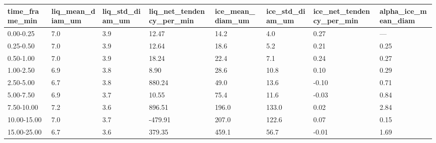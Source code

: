 \begin{tabular}{llllllll}
\toprule
time_frame_min & liq_mean_diam_um & liq_std_diam_um & liq_net_tendency_per_min & ice_mean_diam_um & ice_std_diam_um & ice_net_tendency_per_min & alpha_ice_mean_diam \\
\midrule
0.00-0.25 & 7.0 & 3.9 & 12.47 & 14.2 & 4.0 & 0.27 & — \\
0.25-0.50 & 7.0 & 3.9 & 12.64 & 18.6 & 5.2 & 0.21 & 0.25 \\
0.50-1.00 & 7.0 & 3.9 & 18.24 & 22.4 & 7.1 & 0.24 & 0.27 \\
1.00-2.50 & 6.9 & 3.8 & 8.90 & 28.6 & 10.8 & 0.10 & 0.29 \\
2.50-5.00 & 6.7 & 3.8 & 880.24 & 49.0 & 13.6 & -0.10 & 0.71 \\
5.00-7.50 & 6.9 & 3.7 & 10.55 & 75.4 & 11.6 & -0.03 & 0.84 \\
7.50-10.00 & 7.2 & 3.6 & 896.51 & 196.0 & 133.0 & 0.02 & 2.84 \\
10.00-15.00 & 7.0 & 3.7 & -479.91 & 207.0 & 122.6 & 0.07 & 0.15 \\
15.00-25.00 & 6.7 & 3.6 & 379.35 & 459.1 & 56.7 & -0.01 & 1.69 \\
\bottomrule
\end{tabular}
